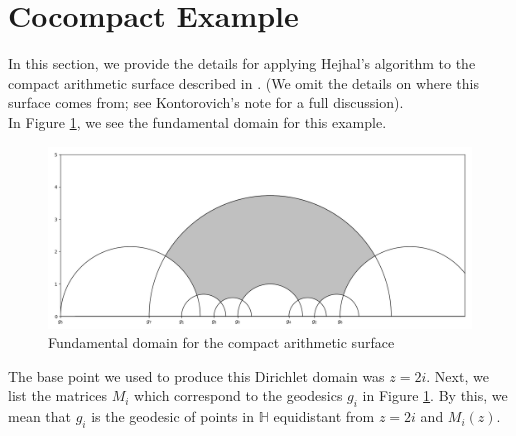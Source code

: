\documentclass[]{article}
\begin{document}
\section*{Cocompact Example}

In this section, we provide the details for applying Hejhal's algorithm to the compact arithmetic surface described in \cite{kontorovich2011}.
(We omit the details on where this surface comes from; see Kontorovich's note for a full discussion).
\\

In Figure \ref{FD}, we see the fundamental domain for this example.
\begin{figure}[h]
	\centering
	\includegraphics[width=\linewidth]{cocompact_fd.png}
	\caption{Fundamental domain for the compact arithmetic surface}
	\label{FD}
\end{figure}
The base point we used to produce this Dirichlet domain was $z = 2i$.
Next, we list the matrices $M_i$ which correspond to the geodesics $g_i$ in Figure \ref{FD}.
By this, we mean that $g_i$ is the geodesic of points in $\mathbb{H}$ equidistant from $z = 2i$ and $M_i(z)$.
\end{document}
